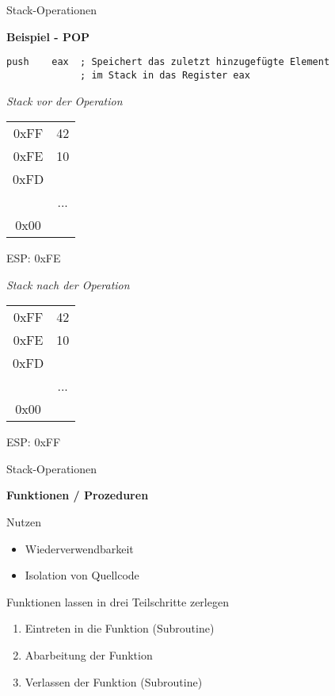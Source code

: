 \begin{frame}[fragile]{Stack-Operationen}

\begin{center}
\textbf{Beispiel - POP}
\end{center}

\begin{lstlisting}
push    eax  ; Speichert das zuletzt hinzugefügte Element
             ; im Stack in das Register eax
\end{lstlisting}

\begin{multicols}{2}

\begin{minipage}{5cm}
\emph{Stack vor der Operation}
\begin{tabular}{c|c|}
    \cline{2-2}
   0xFF & 42\\ \cline{2-2}
   0xFE & 10\\ \cline{2-2}
   0xFD & \\ \cline{2-2}
        & ... \\ \cline{2-2}
     0x00 & \\ \cline{2-2}
\end{tabular}
ESP: 0xFE
\end{minipage}

\begin{minipage}{5cm}
\emph{Stack nach der Operation}
\begin{tabular}{c|c|}
    \cline{2-2}
   0xFF & 42\\ \cline{2-2}
   0xFE & 10\\ \cline{2-2}
   0xFD & \\ \cline{2-2}
          & ... \\ \cline{2-2}
     0x00 & \\ \cline{2-2}
\end{tabular}
ESP: 0xFF
\end{minipage}
\end{multicols}
\end{frame}


\begin{frame}[fragile]{Stack-Operationen}

\begin{center}
\textbf{Funktionen / Prozeduren}
\end{center}

Nutzen \begin{itemize}
    \item Wiederverwendbarkeit
    \item Isolation von Quellcode
\end{itemize}

\makebox{}

Funktionen lassen in drei Teilschritte zerlegen
\begin{enumerate}
    \item Eintreten in die Funktion (Subroutine)
    \item Abarbeitung der Funktion
    \item Verlassen der Funktion (Subroutine)
\end{enumerate}
\end{frame}

